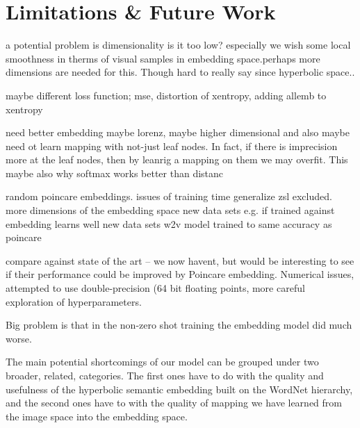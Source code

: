 \documentclass[12pt]{report}
\begin{document}
\section{Limitations \& Future Work}


a potential problem is dimensionality is it too low? especially we wish some local smoothness in therms of visual samples in embedding space.perhaps more dimensions are needed for this. Though hard to really say since hyperbolic space..

maybe different loss function; mse, distortion of xentropy, adding allemb to xentropy

need better embedding maybe lorenz, maybe higher dimensional and also maybe need ot learn mapping with not-just leaf nodes. In fact, if there is imprecision more at the leaf nodes, then by leanrig a mapping on them we may overfit. This maybe also why softmax works better than distanc

random poincare embeddings.
issues of training time
generalize zsl excluded.
more dimensions of the embedding space
new data sets e.g. if trained against embedding learns well new data sets
w2v model trained to same accuracy as poincare  

compare against state of the art -- we now havent, but would be interesting to see if their performance could be improved by Poincare embedding.
Numerical issues, attempted to use double-precision (64 bit floating points, more careful exploration of hyperparameters.












Big problem is that in the non-zero shot training the embedding model did much worse.

The main potential shortcomings of our model can be grouped under two broader, related, categories. The first ones have to do with the quality and usefulness of the hyperbolic semantic embedding built on the WordNet hierarchy, and the second ones have to with the quality of mapping we have learned from the image space into the embedding space.
\end{document}
